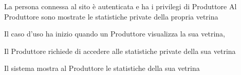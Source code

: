 
{}
{La persona connessa al sito è autenticata e ha i privilegi di Produttore}
{Al Produttore sono mostrate le statistiche private della propria vetrina}
{\begin{enumCU}
		\item Il caso d'uso ha inizio quando un Produttore visualizza la sua vetrina, 
		\item Il Produttore richiede di accedere alle statistiche private della sua vetrina
		\item Il sistema mostra al Produttore le statistiche della sua vetrina
	\end{enumCU}}


